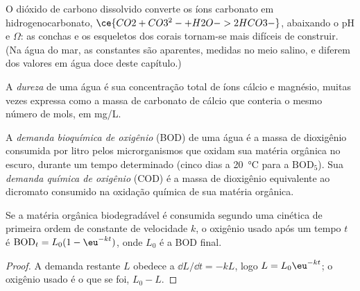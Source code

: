 O dióxido de carbono dissolvido converte os íons carbonato em hidrogenocarbonato, $\ce{CO2 + CO3^2- + H2O -> 2HCO3-}$,
abaixando o pH e $\Omega$: as conchas e os esqueletos dos corais tornam-se mais difíceis de construir. (Na
água do mar, as constantes são aparentes, medidas no meio salino, e
diferem dos valores em água doce deste capítulo.)

\begin{definition}\label{def:b3:environmental-toxicology:hardness}
A \emph{dureza} de uma água é sua concentração total
de íons cálcio e magnésio, muitas vezes expressa como a massa de carbonato de cálcio
que conteria o mesmo número de mols, em mg/L.
\end{definition}

\begin{definition}\label{def:b3:environmental-toxicology:oxygen-demand}
A \emph{demanda bioquímica de oxigênio} (BOD) de uma
água é a massa de dioxigênio consumida por litro pelos microrganismos que oxidam sua
matéria orgânica no escuro, durante um tempo determinado (cinco dias a \qty{20}{\celsius} para a $\mathrm{BOD_5}$). Sua
\emph{demanda química de oxigênio} (COD) é a massa de
dioxigênio equivalente ao dicromato consumido na oxidação química de sua matéria
orgânica.
\end{definition}

\begin{proposition}\label{prop:b3:environmental-toxicology:bod}
Se a matéria orgânica biodegradável é consumida segundo uma cinética de primeira ordem de constante de
velocidade $k$, o oxigênio usado após um tempo $t$ é $\mathrm{BOD}_t = L_0(1 - \eu^{-kt})$, onde $L_0$ é a BOD final.
\end{proposition}

\begin{proof}
A demanda restante $L$ obedece a $\dd L/\dd t = -kL$, logo $L = L_0\eu^{-kt}$; o oxigênio usado é o que se foi,
$L_0 - L$.
\end{proof}

